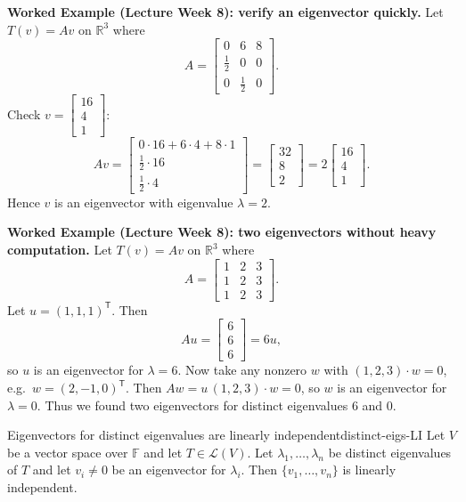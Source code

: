 \begin{examplebox}
\textbf{Worked Example (Lecture Week 8): verify an eigenvector quickly.}
Let $T(v)=Av$ on $\mathbb{R}^3$ where
\[
A=\begin{bmatrix}
0&6&8\\[2pt]
\frac12&0&0\\[2pt]
0&\frac12&0
\end{bmatrix}.
\]
Check $v=\begin{bmatrix}16\\4\\1\end{bmatrix}$:
\[
Av=
\begin{bmatrix}
0\cdot 16+6\cdot 4+8\cdot 1\\
\frac12\cdot 16\\
\frac12\cdot 4
\end{bmatrix}
=
\begin{bmatrix}32\\8\\2\end{bmatrix}
=2\begin{bmatrix}16\\4\\1\end{bmatrix}.
\]
Hence $v$ is an eigenvector with eigenvalue $\lambda=2$.
\end{examplebox}

\begin{examplebox}
\textbf{Worked Example (Lecture Week 8): two eigenvectors without heavy computation.}
Let $T(v)=Av$ on $\mathbb{R}^3$ where
\[
A=\begin{bmatrix}
1&2&3\\
1&2&3\\
1&2&3
\end{bmatrix}.
\]
Let $u=(1,1,1)^{\mathsf T}$. Then
\[
Au=\begin{bmatrix}6\\6\\6\end{bmatrix}=6u,
\]
so $u$ is an eigenvector for $\lambda=6$.
Now take any nonzero $w$ with $(1,2,3)\cdot w=0$, e.g.\ $w=(2,-1,0)^{\mathsf T}$.
Then $Aw=u\,(1,2,3)\cdot w=0$, so $w$ is an eigenvector for $\lambda=0$.
Thus we found two eigenvectors for distinct eigenvalues $6$ and $0$.
\end{examplebox}

\begin{theorem}{Eigenvectors for distinct eigenvalues are linearly independent}{distinct-eigs-LI}
Let $V$ be a vector space over $\mathbb{F}$ and let $T\in\mathcal{L}(V)$.
Let $\lambda_1,\dots,\lambda_n$ be distinct eigenvalues of $T$ and let $v_i\neq 0$ be an eigenvector for $\lambda_i$.
Then $\{v_1,\dots,v_n\}$ is linearly independent.
\end{theorem}


